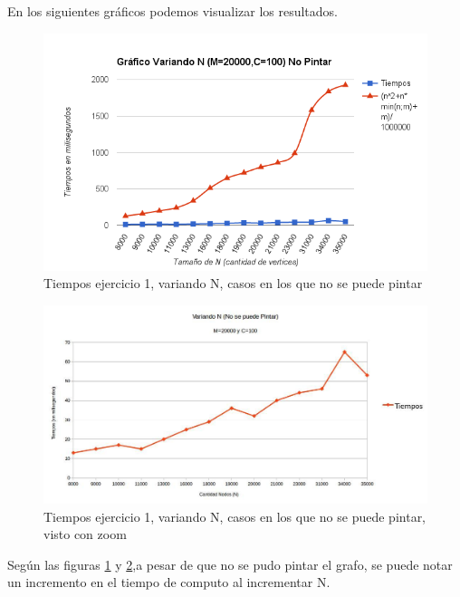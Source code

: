  En los siguientes gráficos podemos visualizar los resultados.

\begin{figure}[H]
 \begin{center}
     \includegraphics[scale=0.6]{../Ejercicio1VariandoNNoPintar.png}
 \end{center}
 \caption{Tiempos ejercicio 1, variando N, casos en los que no se puede pintar}
 \label{nnop}
\end{figure}



\begin{figure}[H]
 \begin{center}
     \includegraphics[scale=0.45]{../M20000C100VariandoNnoSePuedePintar.jpg}
 \end{center}
 \caption{Tiempos ejercicio 1, variando N, casos en los que no se puede pintar, visto con zoom}
 \label{nnopz}
\end{figure}

Según las figuras \ref{nnop} y \ref{nnopz},a pesar de que no se pudo pintar el grafo, se puede notar un incremento en el tiempo de computo al incrementar N.

